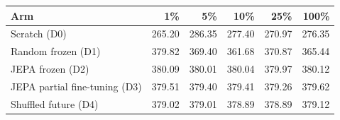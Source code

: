 \begin{tabular}{lrrrrr}
\toprule
Arm & 1\% & 5\% & 10\% & 25\% & 100\% \\
\midrule
Scratch (D0) & 265.20 & 286.35 & 277.40 & 270.97 & 276.35 \\
Random frozen (D1) & 379.82 & 369.40 & 361.68 & 370.87 & 365.44 \\
JEPA frozen (D2) & 380.09 & 380.01 & 380.04 & 379.97 & 380.12 \\
JEPA partial fine-tuning (D3) & 379.51 & 379.40 & 379.41 & 379.26 & 379.62 \\
Shuffled future (D4) & 379.02 & 379.01 & 378.89 & 378.89 & 379.12 \\
\bottomrule
\end{tabular}
